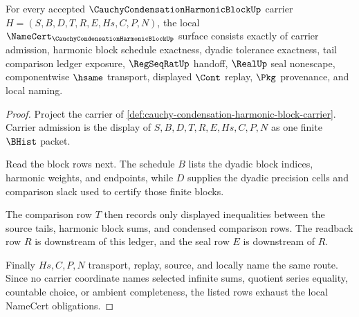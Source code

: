 \begin{theorem}
\label{thm:cauchy-condensation-harmonic-block-obligations}
For every accepted $\CauchyCondensationHarmonicBlockUp$ carrier $H=(S,B,D,T,R,E,Hs,C,P,N)$, the local $\NameCert_{\CauchyCondensationHarmonicBlockUp}$ surface consists exactly of carrier admission, harmonic block schedule exactness, dyadic tolerance exactness, tail comparison ledger exposure, $\RegSeqRatUp$ handoff, $\RealUp$ seal nonescape, componentwise $\hsame$ transport, displayed $\Cont$ replay, $\Pkg$ provenance, and local naming.
\end{theorem}
\begin{proof}
Project the carrier of \autoref{def:cauchy-condensation-harmonic-block-carrier}. Carrier admission is the display of $S,B,D,T,R,E,Hs,C,P,N$ as one finite $\BHist$ packet.

Read the block rows next. The schedule $B$ lists the dyadic block indices, harmonic weights, and endpoints, while $D$ supplies the dyadic precision cells and comparison slack used to certify those finite blocks.

The comparison row $T$ then records only displayed inequalities between the source tails, harmonic block sums, and condensed comparison rows. The readback row $R$ is downstream of this ledger, and the seal row $E$ is downstream of $R$.

Finally $Hs,C,P,N$ transport, replay, source, and locally name the same route. Since no carrier coordinate names selected infinite sums, quotient series equality, countable choice, or ambient completeness, the listed rows exhaust the local NameCert obligations.
\end{proof}


